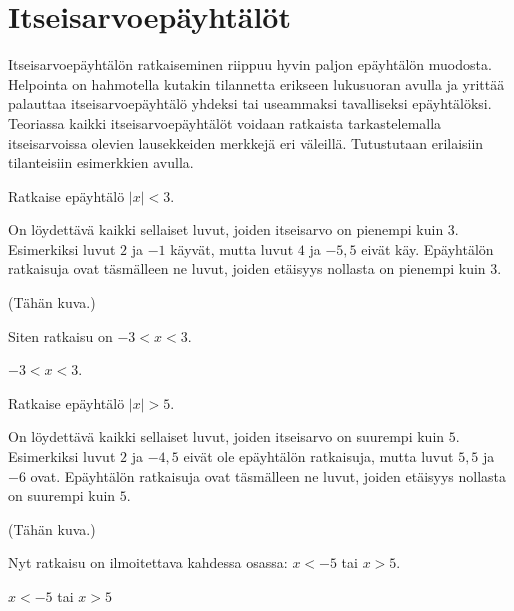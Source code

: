 \section{Itseisarvoepäyhtälöt}


Itseisarvoepäyhtälön ratkaiseminen riippuu hyvin paljon epäyhtälön muodosta. Helpointa on hahmotella kutakin tilannetta erikseen lukusuoran avulla ja yrittää palauttaa itseisarvoepäyhtälö yhdeksi tai useammaksi tavalliseksi epäyhtälöksi. Teoriassa kaikki itseisarvoepäyhtälöt voidaan ratkaista tarkastelemalla itseisarvoissa olevien lausekkeiden merkkejä eri väleillä. Tutustutaan erilaisiin tilanteisiin esimerkkien avulla.

\begin{esimerkki}
Ratkaise epäyhtälö $|x|<3$.

\begin{esimratk}
On löydettävä kaikki sellaiset luvut, joiden itseisarvo on pienempi kuin $3$. Esimerkiksi luvut $2$ ja $-1$ käyvät, mutta luvut $4$ ja $-5,5$ eivät käy. Epäyhtälön ratkaisuja ovat täsmälleen ne luvut, joiden etäisyys nollasta on pienempi kuin $3$.

(Tähän kuva.)

Siten ratkaisu on $-3<x<3$.
\end{esimratk}

\begin{esimvast}
$-3<x<3$.
\end{esimvast}

\end{esimerkki}

\begin{esimerkki}
Ratkaise epäyhtälö $|x|>5$.

\begin{esimratk}
On löydettävä kaikki sellaiset luvut, joiden itseisarvo on suurempi kuin $5$. Esimerkiksi luvut $2$ ja $-4,5$ eivät ole epäyhtälön ratkaisuja, mutta luvut $5,5$ ja $-6$ ovat. Epäyhtälön ratkaisuja ovat täsmälleen ne luvut, joiden etäisyys nollasta on suurempi kuin $5$.
 
(Tähän kuva.)

Nyt ratkaisu on ilmoitettava kahdessa osassa: $x<-5$ tai $x>5$.
\end{esimratk}

\begin{esimvast}
$x<-5$ tai $x>5$
\end{esimvast}
\end{esimerkki}

